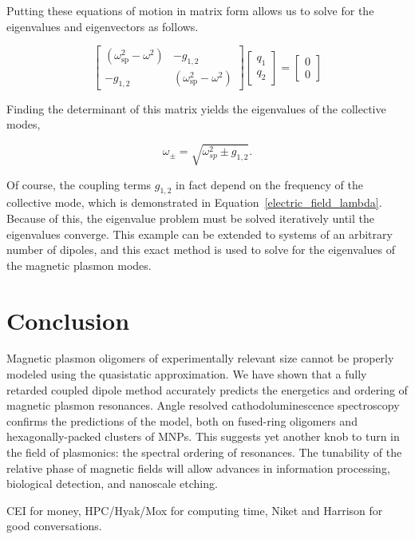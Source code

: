 \documentclass[journal=apchd5,manuscript=article]{achemso}
\begin{document}
Putting these equations of motion in matrix form allows us to solve for the eigenvalues and eigenvectors as follows.

\begin{equation}
\begin{bmatrix}
(\omega_{\textrm{sp}}^2-\omega^2) & -g_{1,2}\\
-g_{1,2} & (\omega_{\textrm{sp}}^2-\omega^2)
\end{bmatrix}
\begin{bmatrix}
q_1\\
q_2
\end{bmatrix}
=
\begin{bmatrix}
0\\
0
\end{bmatrix}
\label{eom_matrix}
\end{equation}

Finding the determinant of this matrix yields the eigenvalues of the collective modes,

\begin{equation}
\omega_{\pm} = \sqrt{\omega_{sp}^2 \pm g_{1,2}}.
\label{eigenvalues}
\end{equation}

\noindent Of course, the coupling terms $g_{1,2}$ in fact depend on the frequency of the collective mode, which is demonstrated in Equation~\ref{electric_field_lambda}. Because of this, the eigenvalue problem must be solved iteratively until the eigenvalues converge. This example can be extended to systems of an arbitrary number of dipoles, and this exact method is used to solve for the eigenvalues of the magnetic plasmon modes.

\section{Conclusion}
Magnetic plasmon oligomers of experimentally relevant size cannot be properly modeled using the quasistatic approximation. We have shown that a fully retarded coupled dipole method accurately predicts the energetics and ordering of magnetic plasmon resonances. Angle resolved cathodoluminescence spectroscopy confirms the predictions of the model, both on fused-ring oligomers and hexagonally-packed clusters of MNPs. This suggests yet another knob to turn in the field of plasmonics: the spectral ordering of resonances. The tunability of the relative phase of magnetic fields will allow advances in information processing, biological detection, and nanoscale etching.


\begin{acknowledgement}
CEI for money, HPC/Hyak/Mox for computing time, Niket and Harrison for good conversations.
\end{acknowledgement}


\end{document}

